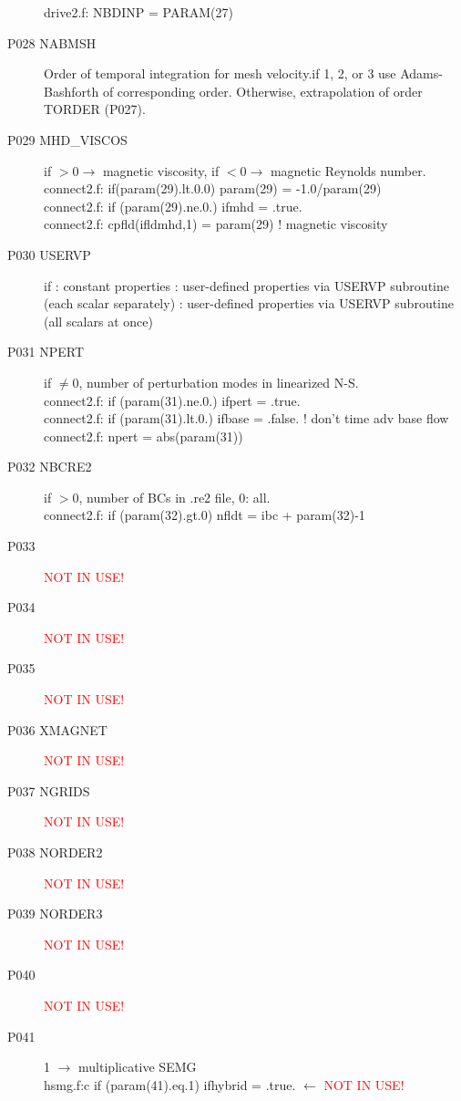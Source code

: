 \begin{description}
drive2.f:      NBDINP = PARAM(27)
\item [P028  NABMSH] Order of temporal integration for mesh velocity.if 1, 2, or 3 use Adams-Bashforth of corresponding order. Otherwise, extrapolation of order TORDER (P027).\\
\item [P029  MHD\_VISCOS] if \(>0 \rightarrow\) magnetic viscosity, if \(<0 \rightarrow\) magnetic Reynolds number.\\
connect2.f:      if(param(29).lt.0.0) param(29) = -1.0/param(29)\\
connect2.f:      if (param(29).ne.0.) ifmhd  = .true.\\
connect2.f:         cpfld(ifldmhd,1) = param(29)  ! magnetic viscosity
\item [P030  USERVP] if
	: constant properties
	: user-defined properties via USERVP subroutine (each scalar separately)
	: user-defined properties via USERVP subroutine (all scalars at once)
\item [P031  NPERT]  if \(\ne 0\), number of perturbation modes in linearized N-S.\\
connect2.f:      if (param(31).ne.0.) ifpert = .true.\\
connect2.f:      if (param(31).lt.0.) ifbase = .false.   ! don't time adv base flow\\
connect2.f:      npert = abs(param(31)) 
\item [P032  NBCRE2] if \(>0\), number of BCs in .re2 file, 0: all.\\
connect2.f:      if (param(32).gt.0) nfldt = ibc + param(32)-1
\item [P033  ] {\textcolor{red}{ NOT IN USE!}}
\item [P034  ] {\textcolor{red}{ NOT IN USE!}}
\item [P035  ] {\textcolor{red}{ NOT IN USE!}}
\item [P036  XMAGNET] {\textcolor{red}{ NOT IN USE!}}
\item [P037  NGRIDS] {\textcolor{red}{ NOT IN USE!}}
\item [P038  NORDER2] {\textcolor{red}{ NOT IN USE!}}
\item [P039  NORDER3] {\textcolor{red}{ NOT IN USE!}}
\item [P040  ] {\textcolor{red}{ NOT IN USE!}}
\item [P041  ] 1 \(\rightarrow\) multiplicative SEMG\\
hsmg.f:c     if (param(41).eq.1) ifhybrid = .true. \(\leftarrow\) {\textcolor{red}{ NOT IN USE!}}

\end{description}
